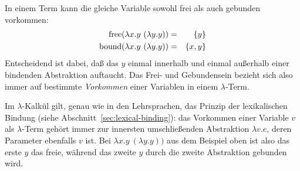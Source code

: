 %
In einem Term kann die gleiche Variable sowohl frei als auch
gebunden vorkommen:
%
\begin{eqnarray*}
  \operatorname{free}(\lambda x.y~(\lambda y.y)) &=& \{ y\} \\
  \operatorname{bound}(\lambda x.y~(\lambda y.y)) &=& \{ x, y\}
\end{eqnarray*}
%
Entscheidend ist dabei, daß das $y$ einmal innerhalb und einmal
außerhalb einer bindenden Abstraktion auftaucht. Das Frei- und
Gebundensein bezieht sich also immer auf bestimmte \emph{Vorkommen}
einer Variablen in einem $\lambda$-Term.

Im $\lambda$-Kalkül gilt, genau wie in den Lehrsprachen, das Prinzip der
lexikalischen Bindung (siehe Abschnitt~\ref{sec:lexical-binding}): das
Vorkommen einer Variable $v$ als $\lambda$-Term gehört immer zur
innersten umschließenden Abstraktion $\lambda v.e$, deren Parameter
ebenfalls $v$ ist.  Bei $\lambda x.y~(\lambda y.y))$ aus dem Beispiel
oben ist also das erste $y$ das freie, während das zweite $y$ durch
die zweite Abstraktion gebunden wird.

